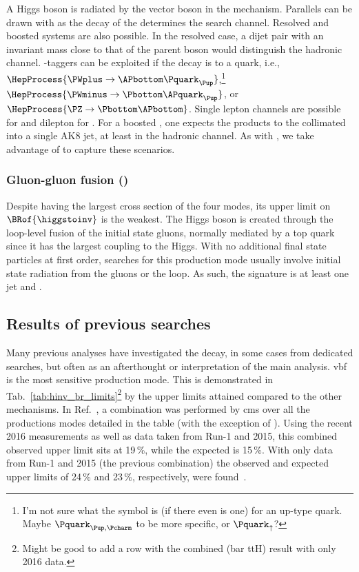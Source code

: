 A Higgs boson is radiated by the vector boson \PVec in the \VH mechanism. Parallels can be drawn with \ttH as the decay of the \PVec determines the search channel. Resolved and boosted systems are also possible. In the resolved case, a dijet pair with an invariant mass close to that of the parent boson would distinguish the hadronic channel. \Pbottom-taggers can be exploited if the decay is to a \Pbottom quark, i.e., $\HepProcess{\PWplus \to \APbottom\Pquark_{\Pup}}$,\footnote{I'm not sure what the symbol is (if there even is one) for an up-type quark. Maybe $\Pquark_{\Pup, \Pcharm}$ to be more specific, or $\Pquark_{\uparrow}$?} $\HepProcess{\PWminus \to \Pbottom\APquark_{\Pup}}$, or $\HepProcess{\PZ \to \Pbottom\APbottom}$. Single lepton channels are possible for \WH and dilepton for \ZH. For a boosted \PVec, one expects the products to the collimated into a single AK8 \gls{jet}, at least in the hadronic channel. As with \ttH, we take advantage of \deepakeight to capture these scenarios. 




\subsubsection{Gluon-gluon fusion (\texorpdfstring{\ggH}{ggH})}
\label{subsubsec:theory_hinv_ggF_mode}

Despite \ggH having the largest cross section of the four modes, its upper limit on $\BRof{\higgstoinv}$ is the weakest. The Higgs boson is created through the loop-level fusion of the initial state gluons, normally mediated by a top quark since it has the largest coupling to the Higgs. With no additional final state particles at first order, searches for this production mode usually involve initial state radiation from the gluons or the loop. As such, the signature is at least one \gls{jet} and \ptmiss.




\subsection{Results of previous searches}
\label{subsec:theory_hinv_prev_results}

Many previous analyses have investigated the \higgstoinv decay, in some cases from dedicated searches, but often as an afterthought or interpretation of the main analysis. \acrshort{vbf} is the most sensitive production mode. This is demonstrated in Tab.~\ref{tab:hinv_br_limits}\footnote{Might be good to add a row with the combined (bar ttH) result with only 2016 data.} by the upper limits attained compared to the other mechanisms. In Ref.~, a combination was performed by \acrshort{cms} over all the productions modes detailed in the table (with the exception of \ttH). Using the recent 2016 measurements as well as data taken from Run-1 and 2015, this combined observed upper limit sits at 19\,\%, while the expected is 15\,\%. With only data from Run-1 and 2015 (the previous combination) the observed and expected upper limits of 24\,\% and 23\,\%, respectively, were found~\cite{Khachatryan:2016whc}.

